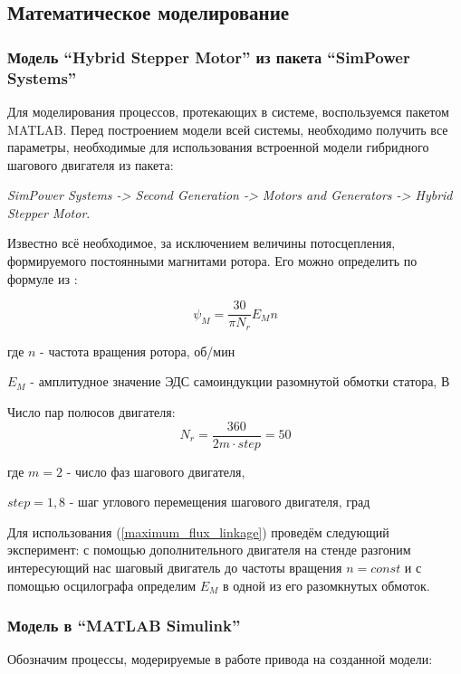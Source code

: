 \subsection{Математическое моделирование}

\subsubsection{Модель ``Hybrid Stepper Motor'' из пакета ``SimPower Systems''}

Для моделирования процессов, протекающих в системе, воспользуемся пакетом MATLAB.
Перед построением модели всей системы, необходимо получить все параметры,
необходимые для использования встроенной модели гибридного шагового двигателя из пакета:

\textit{SimPower Systems -> Second Generation -> Motors and Generators -> Hybrid Stepper Motor}.

Известно всё необходимое, за исключением величины потосцепления, формируемого
постоянными магнитами ротора. Его можно определить по формуле
из \cite{Matlab_help_stepper_motor}:

\begin{equation}
    \label{maximum_flux_linkage}
    \psi_{M} = \frac{30}{\pi N_{r}} E_{M} n
\end{equation}

где $n$ - частота вращения ротора, об/мин

$E_{M}$ - амплитудное значение ЭДС самоиндукции разомнутой обмотки статора, В
\vspace{\baselineskip}

Число пар полюсов двигателя:
$$
N_{r} = \frac{360}{2m \cdot step} = 50
$$

где $m = 2$ - число фаз шагового двигателя,

$step = 1,8$ - шаг углового перемещения шагового двигателя, град

Для использования (\ref{maximum_flux_linkage}) проведём следующий эксперимент:
с помощью дополнительного двигателя на стенде разгоним интересующий нас шаговый
двигатель до частоты вращения $n = const$ и с помощью осцилографа определим $E_{M}$
в одной из его разомкнутых обмоток.

\subsubsection{Модель в ``MATLAB Simulink''}
Обозначим процессы, модерируемые в работе привода на созданной модели:

